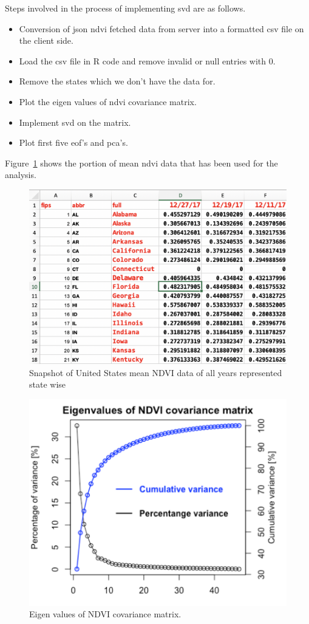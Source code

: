 Steps involved in the process of implementing \gls{svd} are as follows.

\begin{itemize}
    \item Conversion of \gls{json} \gls{ndvi} fetched data from server into a formatted \gls{csv} file on the client side.
    \item Load the csv file in R code and remove invalid or null entries with 0.
    \item Remove the states which we don't have the data for.
    \item Plot the eigen values of \gls{ndvi} covariance matrix.
    \item Implement \gls{svd} on the matrix.
    \item Plot first five \gls{eof}'s and \gls{pca}'s.
\end{itemize}

Figure~\ref{fig:svd_data_snapshot} shows the portion of mean \gls{ndvi} data that has been used for the analysis.

  \begin{figure}[H]
            \centering
            \includegraphics[width=0.9\linewidth]{figures/ch5/svd_data_snapshot.png}
            \caption{\label{fig:svd_data_snapshot} Snapshot of United States mean NDVI data of all years represented state wise}
    \end{figure}
    
\begin{figure}[H]
            \centering
            \includegraphics[width=0.70\linewidth]{figures/ch5/SVD/covarianceeigen.png}
            \caption{\label{fig:covriance} Eigen values of NDVI covariance matrix.}
    \end{figure}
    
